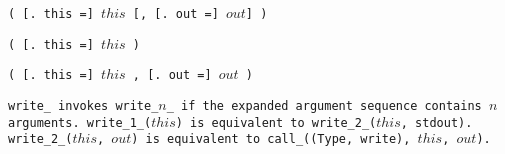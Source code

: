 
\s\s\s\tt{(} [\tt{. this =}]
$this$ [\tt{,} [\tt{. out =}] $out$] \tt{)}

\s\tt{(} [\tt{. this =}] $this$ \phantom{[}\tt{)}

\s\tt{(} [\tt{. this =}] $this$
\phantom{[}\tt{,} [\tt{. out =}] $out$ \phantom{[}\tt{)}


\tt{write_} invokes \tt{write_}$n$\_ if the
expanded argument sequence contains $n$ arguments.
\tt{write_1_(}$this$\tt{)} is equivalent to \tt{write_2_(}$this$\tt{, stdout)}.
\tt{write_2_(}$this$\tt{,} $out$\tt{)} is equivalent
to \tt{call_((Type, write),} $this$\tt{,} $out$\tt{)}.
